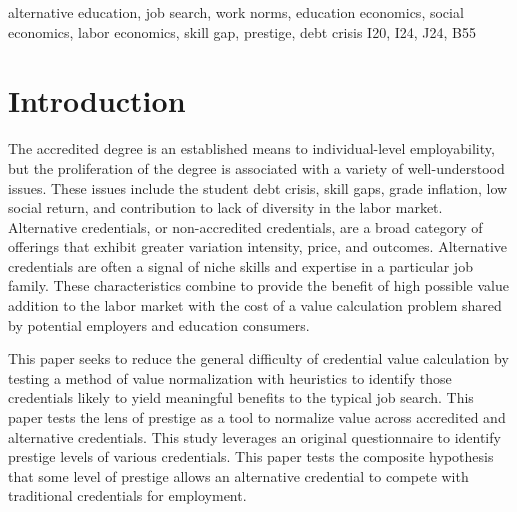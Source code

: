 \documentclass[review]{elsarticle}
\begin{document}
\begin{frontmatter}
    \begin{keyword}
        alternative education, job search, work norms, education economics, social economics, labor economics, skill gap, prestige, debt crisis    %
        \MSC[2010] I20, I24, J24, B55                                                                     %
    \end{keyword}

\end{frontmatter}

\pagebreak
\linenumbers

\section{Introduction}

The accredited degree is an established means to individual-level employability, but the proliferation of the degree is associated with a variety of well-understood issues.
These issues include the student debt crisis, skill gaps, grade inflation, low social return, and contribution to lack of diversity in the labor market.
Alternative credentials, or non-accredited credentials, are a broad category of offerings that exhibit greater variation intensity, price, and outcomes\cite{urdan_2020}.
Alternative credentials are often a signal of niche skills and expertise in a particular job family.
These characteristics combine to provide the benefit of high possible value addition to the labor market
with the cost of a value calculation problem shared by potential employers and education consumers.

This paper seeks to reduce the general difficulty of credential value calculation by testing a method of value normalization
with heuristics to identify those credentials likely to yield meaningful benefits to the typical job search.
This paper tests the lens of prestige as a tool to normalize value across accredited and alternative credentials.
This study leverages an original questionnaire to identify prestige levels of various credentials.
This paper tests the composite hypothesis that some level of prestige allows an alternative credential to compete with traditional credentials for employment.
\end{document}
